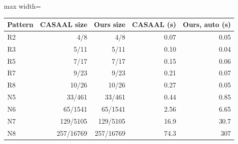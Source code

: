 \begin{adjustbox}{max width=\textwidth}\begin{tabular}{@{}lrrrr@{}}
\toprule
Pattern & CASAAL size & Ours size & CASAAL (s) & Ours, auto (s) \\
\midrule
R2 & 4/8 & 4/8 & 0.07 & 0.05 \\
R3 & 5/11 & 5/11 & 0.10 & 0.04 \\
R5 & 7/17 & 7/17 & 0.15 & 0.06 \\
R7 & 9/23 & 9/23 & 0.21 & 0.07 \\
R8 & 10/26 & 10/26 & 0.27 & 0.05 \\
N5 & 33/461 & 33/461 & 0.44 & 0.85 \\
N6 & 65/1541 & 65/1541 & 2.56 & 6.65 \\
N7 & 129/5105 & 129/5105 & 16.9 & 30.7 \\
N8 & 257/16769 & 257/16769 & 74.3 & 307 \\
\bottomrule
\end{tabular}\end{adjustbox}
